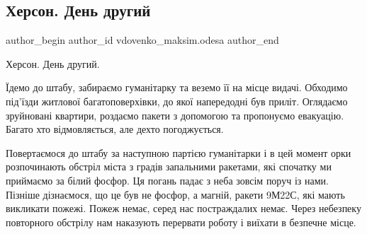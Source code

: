 
 
 
 
 

\subsection{Херсон. День другий}
\label{sec:28_12_2022.fb.vdovenko_maksim.odesa.1.kherson__den_drugii}

\ifcmt
 author_begin
   author_id vdovenko_maksim.odesa
 author_end
\fi

Херсон. День другий.

Їдемо до штабу, забираємо гуманітарку та веземо її на місце видачі. Обходимо
під'їзди житлової багатоповерхівки, до якої напередодні був приліт. Оглядаємо
зруйновані квартири, роздаємо пакети з допомогою та пропонуємо евакуацію.
Багато хто відмовляється, але дехто погоджується.

Повертаємося до штабу за наступною партією гуманітарки і в цей момент орки
розпочинають обстріл міста з градів запальними ракетами, які спочатку ми
приймаємо за білий фосфор. Ця погань падає з неба зовсім поруч із нами. Пізніше
дізнаємося, що це був не фосфор, а магній, ракети 9М22С, які мають викликати
пожежі. Пожеж немає, серед нас постраждалих немає. Через небезпеку повторного
обстрілу нам наказують перервати роботу і виїхати в безпечне місце.
